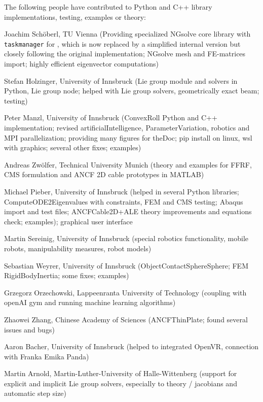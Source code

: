 The following people have contributed to Python and C++ library implementations, testing, examples or theory:
\bi
  \item Joachim Sch{\"o}berl, TU Vienna (Providing specialized NGsolve \cite{Schoeberl1997,NGsolve2014,NGsolve2022} core library with \texttt{taskmanager} for , which is now replaced by a simplified internal version but closely following the original implementation; NGsolve mesh and FE-matrices import; highly efficient eigenvector computations)
  \item Stefan Holzinger, University of Innsbruck (Lie group module and solvers in Python, Lie group node; helped with Lie group solvers, geometrically exact beam; testing)
  \item Peter Manzl, University of Innsbruck (ConvexRoll Python and C++ implementation; revised artificialIntelligence, ParameterVariation, robotics and MPI parallelization; providing many figures for theDoc; pip install on linux, wsl with graphics; several other fixes; examples)
  \item Andreas Zw{\"o}lfer, Technical University Munich (theory and examples for FFRF, CMS formulation and ANCF 2D cable prototypes in MATLAB)
  \item Michael Pieber, University of Innsbruck (helped in several Python libraries; ComputeODE2Eigenvalues with constraints, FEM and CMS testing; Abaqus import and test files; ANCFCable2D+ALE theory improvements and equations check; examples); \codeName graphical user interface
  \item Martin Sereinig, University of Innsbruck (special robotics functionality, mobile robots, manipulability measures, robot models)
  \item Sebastian Weyrer, University of Innsbruck (ObjectContactSphereSphere; FEM RigidBodyInertia; some fixes; examples)
  \item Grzegorz Orzechowski, Lappeenranta University of Technology (coupling with openAI gym and running machine learning algorithms)
  \item Zhaowei Zhang, Chinese Academy of Sciences (ANCFThinPlate; found several issues and bugs)
  \item Aaron Bacher, University of Innsbruck (helped to integrated OpenVR, connection with Franka Emika Panda)
  \item Martin Arnold, Martin-Luther-University of Halle-Wittenberg (support for explicit and implicit Lie group solvers, especially to theory / jacobians and automatic step size)
